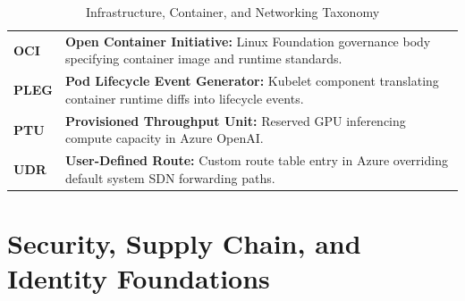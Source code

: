 \documentclass[11pt,oneside]{book}
\begin{document}
\begin{table}[htbp]
\begin{tabular}{lp{9.5cm}}
\textbf{OCI} & \textbf{Open Container Initiative:} Linux Foundation governance body specifying container image and runtime standards. \\
\textbf{PLEG} & \textbf{Pod Lifecycle Event Generator:} Kubelet component translating container runtime diffs into lifecycle events. \\
\textbf{PTU} & \textbf{Provisioned Throughput Unit:} Reserved GPU inferencing compute capacity in Azure OpenAI. \\
\textbf{UDR} & \textbf{User-Defined Route:} Custom route table entry in Azure overriding default system SDN forwarding paths. \\
\bottomrule
\end{tabular}
\caption{Infrastructure, Container, and Networking Taxonomy}
\label{tab:v3-infra-taxonomy}
\end{table}

\newpage
\section*{Security, Supply Chain, and Identity Foundations}
\end{document}
